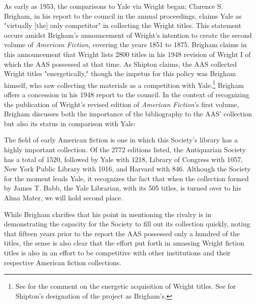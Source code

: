 As early as 1953, the comparisons to Yale via Wright began; Clarence S. Brigham, in his report to the council in the annual proceedings, claims Yale as "virtually [the] only competitor" in collecting the Wright titles. This statement occurs amidst Brigham's announcement of Wright's intention to create the second volume of \textit{American Fiction}, covering the years 1851 to 1875. Brigham claims in this announcement that Wright lists 2800 titles in his 1948 revision of Wright I of which the AAS possessed at that time.\autocite[9]{clarence_s._brigham_report_1953} As Shipton claims, the AAS collected Wright titles "energetically," though the impetus for this policy was Brigham himself, who saw collecting the materials as a competition with Yale.\footnote{See \autocite[364]{clifford_k._shipton_report_1960} for the comment on the energetic acquisition of Wright titles. See \autocite[271]{clifford_k._shipton_report_1954} for Shipton's designation of the project as Brigham's.} Brigham offers a concession in his 1948 report to the council. In the context of recognizing the publication of Wright's revised edition of \textit{American Fiction}'s first volume, Brigham discusses both the importance of the bibliography to the AAS' collection but also its status in comparison with Yale:
\begin{displayquote}
The field of early American fiction is one in which this
Society's library has a highly important collection. Of the 2772 editions listed, the Antiquarian Society has a total of 1520, followed by Yale with 1218, Library of Congress with 1057, New York Public Library with 1016, and Harvard with 846. Although the Society for the moment leads Yale, it recognizes the fact that when the collection formed by James T. Babb, the Yale Librarian, with its 505 titles, is turned over to his Alma Mater, we will hold second place.\autocite[197]{clarence_s._brigham_report_1948}
\end{displayquote} 
While Brigham clarifies that his point in mentioning the rivalry is in demonstrating the capacity for the Society to fill out its collection quickly, noting that fifteen years prior to the report the AAS possessed only a hundred of the titles, the sense is also clear that the effort put forth in amassing Wright fiction titles is also in an effort to be competitive with other institutions and their respective American fiction collections. 

